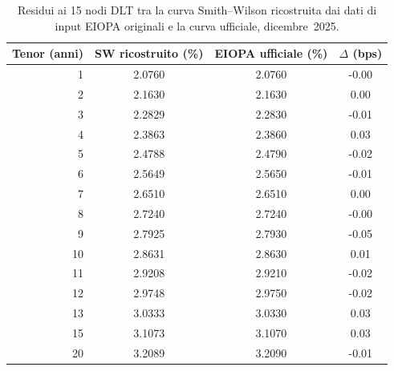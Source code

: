 \begin{table}[H]\centering\small
\caption{Residui ai 15 nodi DLT tra la curva Smith--Wilson ricostruita dai dati di input EIOPA originali e la curva ufficiale, dicembre~2025.}
\label{tab:residui-ye25-dic}\renewcommand{\arraystretch}{1.15}
\begin{tabular}{rccc}
\toprule
\textbf{Tenor} (anni) & SW ricostruito (\%) & EIOPA ufficiale (\%) & $\Delta$ (bps)\\
\midrule
1 & 2.0760 & 2.0760 & -0.00\\
2 & 2.1630 & 2.1630 & 0.00\\
3 & 2.2829 & 2.2830 & -0.01\\
4 & 2.3863 & 2.3860 & 0.03\\
5 & 2.4788 & 2.4790 & -0.02\\
6 & 2.5649 & 2.5650 & -0.01\\
7 & 2.6510 & 2.6510 & 0.00\\
8 & 2.7240 & 2.7240 & -0.00\\
9 & 2.7925 & 2.7930 & -0.05\\
10 & 2.8631 & 2.8630 & 0.01\\
11 & 2.9208 & 2.9210 & -0.02\\
12 & 2.9748 & 2.9750 & -0.02\\
13 & 3.0333 & 3.0330 & 0.03\\
15 & 3.1073 & 3.1070 & 0.03\\
20 & 3.2089 & 3.2090 & -0.01\\
\bottomrule
\end{tabular}
\end{table}
